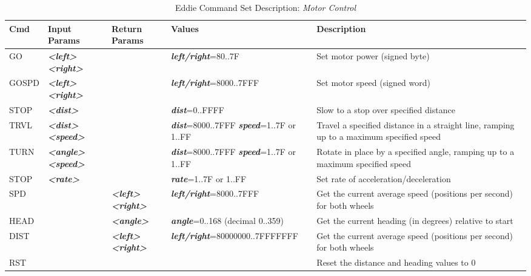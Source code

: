 \begin{table}[H]
\caption{Eddie Command Set Description: \textit{Motor Control}}
\label{tab:eddie_commands}
\begin{tabular}{|p{3em}|p{6.7em}|p{5.7em}|p{8.5em}|p{15em}|}
\hline
\textbf{\large Cmd} & \textbf{\large Input Params} & \textbf{\large Return Params} & \textbf{\large Values} & \textbf{\large Description} \\ \hline \hline
GO & \textit{\textbf{<left>}}\textit{\textbf{<right>}} &  & \textit{\textbf{left/right}}=80..7F & Set motor power (signed byte) \\ \hline
GOSPD & \textit{\textbf{<left>}}\textit{\textbf{<right>}} &  & \textit{\textbf{left/right}}=8000..7FFF & Set motor speed (signed word) \\ \hline
STOP & \textit{\textbf{<dist>}} &  & \textit{\textbf{dist}}=0..FFFF & Slow to a stop over specified distance \\ \hline
TRVL & \textit{\textbf{<dist>}}\textit{\textbf{<speed>}} &  & \textit{\textbf{dist}}=8000..7FFF \newline \textit{\textbf{speed}}=1..7F or 1..FF & Travel a specified distance in a straight line, ramping up to a maximum specified speed \\ \hline
TURN & \textit{\textbf{<angle>}}\textit{\textbf{<speed>}} &  & \textit{\textbf{dist}}=8000..7FFF \newline \textit{\textbf{speed}}=1..7F or 1..FF & Rotate in place by a specified angle, ramping up to a maximum specified speed \\ \hline
STOP & \textit{\textbf{<rate>}} &  & \textit{\textbf{rate}}=1..7F or 1..FF & Set rate of acceleration/deceleration \\ \hline
SPD & & \textit{\textbf{<left>}}\textit{\textbf{<right>}} & \textit{\textbf{left/right}}=8000..7FFF & Get the current average speed (positions per
second) for both wheels \\ \hline
HEAD & & \textit{\textbf{<angle>}} & \textit{\textbf{angle}}=0..168 \newline(decimal 0..359) & Get the current heading (in degrees) relative to
start \\ \hline
DIST & & \textit{\textbf{<left>}}\textit{\textbf{<right>}} & \textit{\textbf{left/right}}=80000000..\newline 7FFFFFFF & Get the current average speed (positions per second) for both wheels \\ \hline
RST &  &  &  & Reset the distance and heading values to 0 \\ \hline
\end{tabular}
\end{table}

